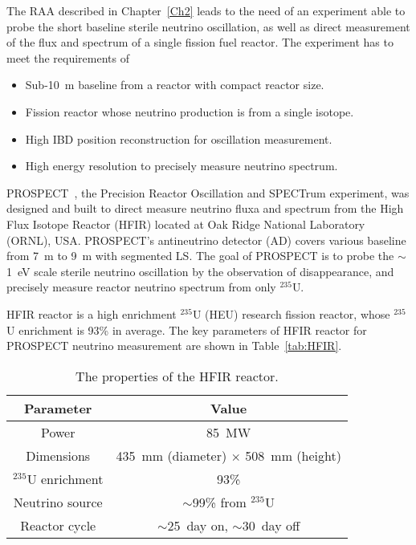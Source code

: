     
    The RAA described in Chapter~\ref{Ch2} leads to the need of an experiment able to probe the short baseline sterile neutrino oscillation, as well as direct measurement of the flux and spectrum of a single fission fuel reactor. 
    The experiment has to meet the requirements of 
    \begin{itemize}
        \item Sub-10~m baseline from a reactor with compact reactor size. 
        \item Fission reactor whose neutrino production is from a single isotope.
        \item High IBD position reconstruction for oscillation measurement.
        \item High energy resolution to precisely measure neutrino spectrum.
    \end{itemize}
    
    PROSPECT~\cite{bib:prospect_physics, bib:prospect_nim}, the Precision Reactor Oscillation and SPECTrum experiment, was designed and built to direct measure neutrino fluxa and spectrum from the High Flux Isotope Reactor (HFIR) located at Oak Ridge National Laboratory (ORNL), USA. 
    PROSPECT's antineutrino detector (AD) covers various baseline from 7~m to 9~m with segmented LS.
    The goal of PROSPECT is to probe the $\sim$1~eV scale sterile neutrino oscillation by the observation of \nuebar disappearance, and precisely measure reactor neutrino spectrum from only $^{235}$U.
    

    HFIR reactor is a high enrichment $^{235}$U (HEU) research fission reactor, whose $^{235}$U enrichment is 93\% in average.
    The key parameters of HFIR reactor for PROSPECT neutrino measurement are shown in Table~\ref{tab:HFIR}.
\begin{table}[h]
    \centering
    \begin{tabular}{cc}
    \hline
    \hline
    Parameter  & Value   \\ 
    \hline
    Power    & 85~MW \\
    \hline
    Dimensions     & 435~mm (diameter) $\times$ 508~mm (height) \\
    \hline
    $^{235}$U enrichment & 93\% \\
    \hline
    Neutrino source & $\sim$99\% from $^{235}$U \\
    \hline
    Reactor cycle & $\sim$25~day on, $\sim$30~day off \\
    \hline
    \hline
    \end{tabular}
    \caption[HFIR parameters]{The properties of the HFIR reactor.}
\label{tab:HIFR}
\end{table}

